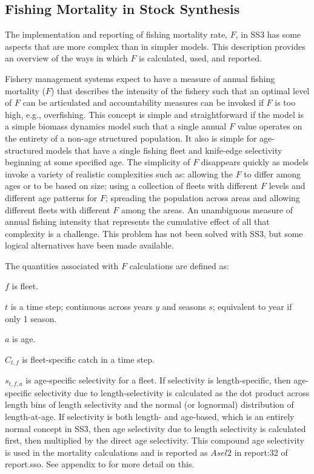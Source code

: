 \subsection{Fishing Mortality in Stock Synthesis}

The implementation and reporting of fishing mortality rate, $F$, in SS3 has some aspects that are more complex than in simpler models. This description provides an overview of the ways in which $F$ is calculated, used, and reported.  

Fishery management systems expect to have a measure of annual fishing mortality ($F$) that describes the intensity of the fishery such that an optimal level of $F$ can be articulated and accountability measures can be invoked if $F$ is too high, e.g., overfishing. This concept is simple and straightforward if the model is a simple biomass dynamics model such that a single annual $F$ value operates on the entirety of a non-age structured population. It also is simple for age-structured models that have a single fishing fleet and knife-edge selectivity beginning at some specified age. The simplicity of $F$ disappears quickly as models invoke a variety of realistic complexities such as: allowing the $F$ to differ among ages or to be based on size; using a collection of fleets with different $F$ levels and different age patterns for $F$; spreading the population across areas and allowing different fleets with different $F$ among the areas. An unambiguous measure of annual fishing intensity that represents the cumulative effect of all that complexity is a challenge. This problem has not been solved with SS3, but some logical alternatives have been made available.


The quantities associated with $F$ calculations are defined as:

$f$ is fleet.

$t$ is a time step; continuous across years $y$ and seasons $s$; equivalent to year if only 1 season.

$a$ is age.

$C_{t,f}$ is fleet-specific catch in a time step.

$s_{t,f,a}$ is age-specific selectivity for a fleet. If selectivity is length-specific, then age-specific selectivity due to length-selectivity is calculated as the dot product across length bins of length selectivity and the normal (or lognormal) distribution of length-at-age. If selectivity is both length- and age-based, which is an entirely normal concept in SS3, then age selectivity due to length selectivity is calculated first, then multiplied by the direct age selectivity. This compound age selectivity is used in the mortality calculations and is reported as $Asel2$ in report:32 of report.sso. See appendix to \citet{methotstock2013} for more detail on this.

